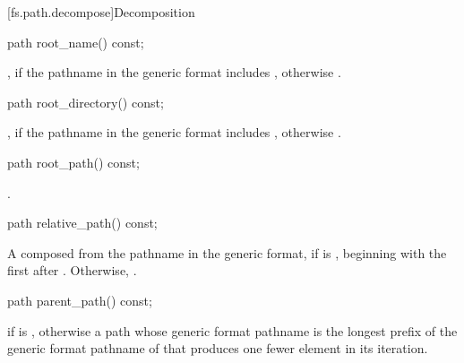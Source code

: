 [fs.path.decompose]{Decomposition}

%
\begin{itemdecl}
path root_name() const;
\end{itemdecl}

\begin{itemdescr}
\pnum
\returns {}, if the pathname in the generic format
includes , otherwise .
\end{itemdescr}

%
\begin{itemdecl}
path root_directory() const;
\end{itemdecl}

\begin{itemdescr}
\pnum
\returns {}, if the pathname in the generic format
includes , otherwise .
\end{itemdescr}

%
\begin{itemdecl}
path root_path() const;
\end{itemdecl}

\begin{itemdescr}
\pnum
\returns {}.
\end{itemdescr}

%
\begin{itemdecl}
path relative_path() const;
\end{itemdecl}

\begin{itemdescr}
\pnum
\returns A  composed from the pathname in the generic format,
if  is , beginning
with the first  after . Otherwise, .
\end{itemdescr}

%
\begin{itemdecl}
path parent_path() const;
\end{itemdecl}

\begin{itemdescr}
\pnum
\returns {} if  is ,
otherwise a path whose generic format pathname is
the longest prefix of the generic format pathname of 
that produces one fewer element in its iteration.
\end{itemdescr}

